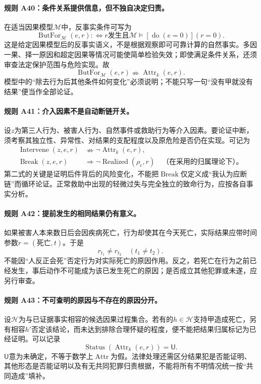 \paragraph{规则 A40：条件关系提供信息，但不独自决定归责。}
在适当因果模型$\mathcal M$中，反事实条件可写为
\[
\operatorname{ButFor}_{\mathcal M}(e,r)
:\!\iff r\text{发生且}\mathcal M\models[\operatorname{do}(e=0)](r=0).
\]
这是给定因果模型后的反事实语义，不是根据观察即可可靠计算的自然事实。多因一果、择一原因和超定因果等情况可能使简单检验失效；即使满足条件关系，还须审查法定保护范围与危险实现。故
\[
\operatorname{ButFor}_{\mathcal M}(e,r)
\nRightarrow\operatorname{Attr}_k(e,r).
\]
模型中的“除去行为后其他条件如何变化”必须说明；不能只写一句“没有甲就没有结果”便当作全部论证。

\paragraph{规则 A41：介入因素不是自动断链开关。}
设$z$为第三人行为、被害人行为、自然事件或救助行为等介入因素。要论证中断，须考察其独立性、异常性、对结果的支配程度以及原危险是否仍在实现。可记为
\[
\begin{aligned}
\operatorname{Intervene}(z,e,r)&\nRightarrow
\neg\operatorname{Attr}_k(e,r),\\
\operatorname{Break}(z,e,r)&\Longrightarrow
\neg\operatorname{Realized}(\rho_e,r)
\quad\text{（在采用的归属理论下）。}
\end{aligned}
\]
第二式的关键是证明后件背后的风险变化，不能把$\operatorname{Break}$仅定义成“我认为应断链”而循环论证。正常救助中出现的轻微过失与完全独立的致命行为，应按各自事实分析。

\paragraph{规则 A42：提前发生的相同结果仍有意义。}
如果被害人本来数日后会因疾病死亡，行为却使其在今天死亡，实际结果应带时间参数$r=(\text{死亡},t)$。于是
\[
r_{t_1}\ne r_{t_2}\quad(t_1\ne t_2).
\]
不能因“人反正会死”否定行为对实际死亡的原因作用。反之，若死亡在行为之前已经发生，事后动作不可能成为该已发生死亡的原因；是否成立其他犯罪或未遂，应另行审查。

\paragraph{规则 A43：不可查明的原因与不存在的原因分开。}
设$\mathcal H$为与已证据事实相容的候选因果过程集合。若有的$h\in\mathcal H$支持甲造成死亡，另有相容$h'$否定该结论，而未达到排除合理怀疑的程度，便不能把结果归属标记为已经证明。可以记录
\[
\operatorname{Status}(\operatorname{Attr}_k(e,r))=\mathsf U.
\]
$\mathsf U$意为未确定，不等于数学上$\operatorname{Attr}$为假。法律处理还需区分结果犯是否能证明、其他形态是否能证明以及有无共同犯罪归责根据，不能将所有不明情况统一按“共同造成”填补。

